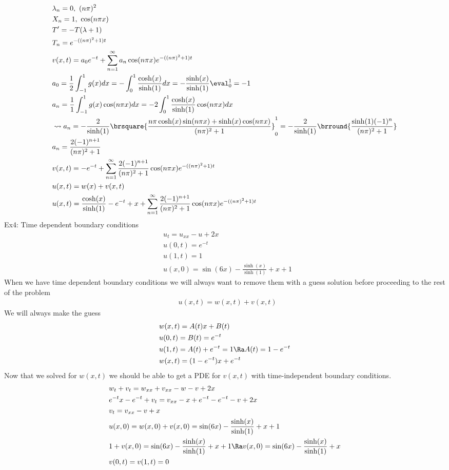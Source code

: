 \begin{align*}
    &\lambda_n=0,\ (n\pi)^2\\
    &X_n=1,\ \cos(n\pi x)\\
    &T'=-T(\lambda+1)\\
    &T_n=e^{-((n\pi)^2+1)t}\\
    &v(x,t)=a_0e^{-t}+\sum_{n=1}^\infty a_n\cos(n\pi x)e^{-((n\pi)^2+1)t}\\
    &a_0=\frac{1}{2}\int_{-1}^1g(x)dx=-\int_0^1\frac{\cosh(x)}{\sinh(1)}dx=-{\frac{\sinh(x)}{\sinh(1)}}\eval_0^1=-1\\
    &a_n=\frac{1}{1}\int_{-1}^1g(x)\cos(n\pi x)dx=-2\int_0^1\frac{\cosh(x)}{\sinh(1)}\cos(n\pi x)dx\\
    &\leadsto a_n=-\frac{2}{\sinh(1)}\brsquare{\frac{n\pi\cosh(x)\sin(n\pi x)+\sinh(x)\cos(n\pi x)}{(n\pi)^2+1}}_0^1=-\frac{2}{\sinh(1)}\brround{\frac{\sinh(1)(-1)^n}{(n\pi)^2+1}}\\
    &a_n=\frac{2(-1)^{n+1}}{(n\pi)^2+1}\\
    &v(x,t)=-e^{-t}+\sum_{n=1}^\infty\frac{2(-1)^{n+1}}{(n\pi)^2+1}\cos(n\pi x)e^{-((n\pi)^2+1)t}\\
    &u(x,t)=w(x)+v(x,t)\\
    &u(x,t)=\frac{\cosh(x)}{\sinh(1)}-e^{-t}+x+\sum_{n=1}^\infty\frac{2(-1)^{n+1}}{(n\pi)^2+1}\cos(n\pi x)e^{-((n\pi)^2+1)t}
\end{align*}
Ex4: Time dependent boundary conditions
\begin{align*}
    &u_t=u_{xx}-u+2x\\
    &u(0,t)=e^{-t}\\
    &u(1,t)=1\\
    &u(x,0)=\sin(6x)-\frac{\sinh(x)}{\sinh(1)}+x+1
\end{align*}
When we have time dependent boundary conditions we will always want to remove them with a guess solution before proceeding to the rest of the problem
\begin{align*}
    &u(x,t)=w(x,t)+v(x,t)
\end{align*}
We will always make the guess
\begin{align*}
    &w(x,t)=A(t)x+B(t)\\
    &u(0,t)=B(t)=e^{-t}\\
    &u(1,t)=A(t)+e^{-t}=1\Ra A(t)=1-e^{-t}\\
    &w(x,t)=(1-e^{-t})x+e^{-t}\
\end{align*}
Now that we solved for $w(x,t)$ we should be able to get a PDE for $v(x,t)$ with time-independent boundary conditions.
\begin{align*}
    &w_t+v_t=w_{xx}+v_{xx}-w-v+2x\\
    &e^{-t}x-e^{-t}+v_t=v_{xx}-x+e^{-t}-e^{-t}-v+2x\\
    &v_t=v_{xx}-v+x\\
    &u(x,0)=w(x,0)+v(x,0)=\sin(6x)-\frac{\sinh(x)}{\sinh(1)}+x+1\\
    &1+v(x,0)=\sin(6x)-\frac{\sinh(x)}{\sinh(1)}+x+1\Ra v(x,0)=\sin(6x)-\frac{\sinh(x)}{\sinh(1)}+x\\
    &v(0,t)=v(1,t)=0
\end{align*}

